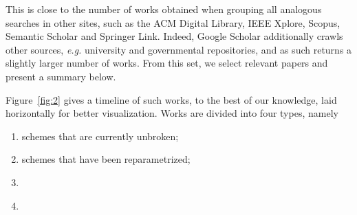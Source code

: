 \documentclass[openright]{report}
\begin{document}
This is close to the number of works obtained when grouping all analogous searches in other sites, such as the ACM Digital Library, IEEE Xplore, Scopus, Semantic Scholar and Springer Link. Indeed, Google Scholar additionally crawls other sources, \emph{e.g.} university and governmental repositories, and as such returns a slightly larger number of works. From this set, we select relevant papers and present a summary below.

Figure~\ref{fig:2} gives a timeline of such works, to the best of our knowledge, laid horizontally for better visualization. Works are divided into four types, namely

\begin{enumerate}[label=(\roman*), itemsep=1pt]
  \item\label{enum:i} schemes that are currently unbroken;
  \item\label{enum:ii} schemes that have been reparametrized;
  \item\label{enum:iii} 
  \item\label{enum:iv} 
\end{enumerate}
\end{document}
